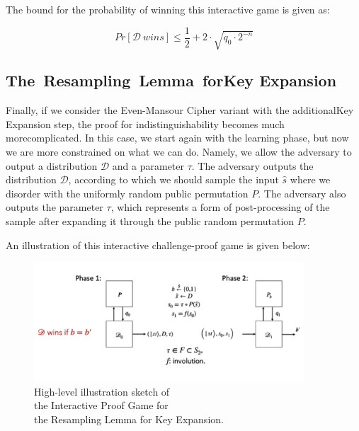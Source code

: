 \documentclass[12pt]{article}
\begin{document}
    
    \noindent The bound for the probability of winning this interactive game is given as:

    $$ Pr[\mathcal{D}\ wins] \leq \frac{1}{2} + 2 \cdot \sqrt{{q}_{0} \cdot {2}^{-n}} $$

    \vspace{4ex}
    
        
    \subsection{\mbox{The Resampling Lemma for}\break Key Expansion}
    \label{subsec:resampling-lemma-key-expansion}

    Finally, if we consider the Even-Mansour Cipher variant with the additional\break Key Expansion step, the proof for indistinguishability becomes much more\break complicated. In this case, we start again with the learning phase, but now we are more constrained on what we can do. Namely, we allow the adversary to output a distribution $\mathcal{D}$ and a parameter $\tau$. The adversary outputs the distribution $\mathcal{D}$, according to which we should sample the input $\hat{s}$ where we disorder with the uniformly random public permutation $P$. The adversary also outputs the parameter $\tau$, which represents a form of post-processing of the sample after expanding it through the public random permutation $P$.
    
    
    \noindent An illustration of this interactive challenge-proof game is given below:
    
    \begin{figure}[ht]
        \captionsetup{justification=centering}
        \centering
        
        \includegraphics[width=0.9\textwidth]{figures/images/img-9.pdf}
        \caption{High-level illustration sketch of\\ the Interactive Proof Game for\\ the Resampling Lemma for Key Expansion.}
    \end{figure}
    
\end{document}
